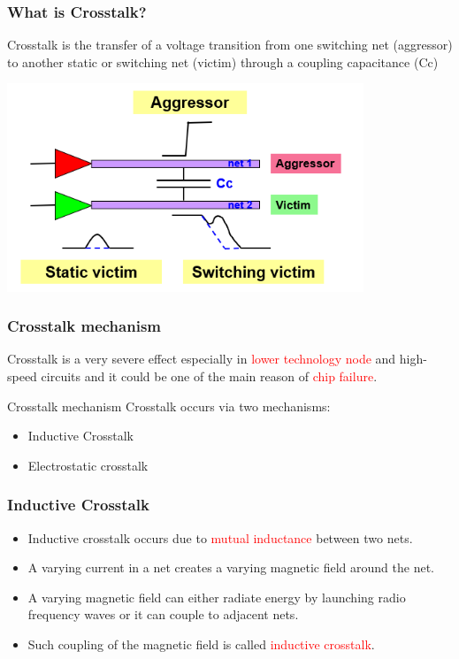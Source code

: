 \documentclass{beamer}
\begin{document}
	\begin{frame}
		\frametitle{What is Crosstalk?}
	\begin{alertblock}
	
	Crosstalk is the transfer of a voltage transition from one switching net (aggressor) to another static or switching net (victim) through a coupling capacitance (Cc)
	
	\end{alertblock}
	\begin{center}
		\includegraphics[width= 0.8\textwidth]{Crosstalk_wafe}
	\end{center}

	 
	\end{frame}
	\begin{frame}
		\frametitle{Crosstalk mechanism}
		Crosstalk is a very severe effect especially in \textcolor{red} { lower technology node }and high-speed circuits and it could be one of the main reason of \textcolor{red} {chip failure}.
		\newline
	
	\begin{alertblock}{Crosstalk mechanism}
		Crosstalk occurs via two mechanisms:
		\begin{itemize}
		\item Inductive Crosstalk
		\item Electrostatic crosstalk
		\end{itemize}
	\end{alertblock}
\end{frame}	
	\begin{frame}
		\frametitle{Inductive Crosstalk}
	\begin{itemize}
		\item Inductive crosstalk occurs due to \textcolor{red} {mutual inductance} between two nets.
		\item A varying current in a net creates a varying magnetic field around the net.
		\item A varying magnetic field can either radiate energy by launching radio frequency waves or it can couple to adjacent nets.
		\item Such coupling of the magnetic field is called \textcolor{red} {inductive crosstalk}. 
	\end{itemize}
		
	\end{frame}
	
\end{document}
